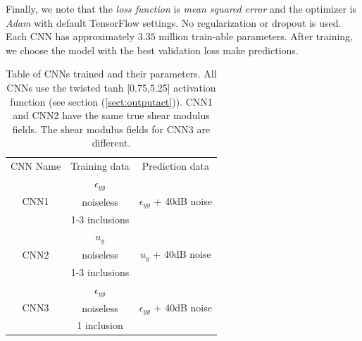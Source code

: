\documentclass[10pt]{article}
\begin{document}
Finally, we note that the \textit{loss function} is \textit{mean squared error} and the optimizer is \textit{Adam} \cite{misc:kingma2017adam} with default TensorFlow settings. No regularization or dropout is used.  Each CNN has approximately $3.35$ million train-able parameters. After training, we choose the model with the best validation loss make predictions.
%
\begin{center}
\begin{table}
  \centering
  \begin{tabular}{|c|c|c|}
    \hline
    \multirow{2}{*}{CNN Name} &  \multirow{2}{*}{Training data}           & \multirow{2}{*}{Prediction data}\\
                              &                                           &  \\
     \hline
     \multirow{3}{*}{CNN1}    &  $\epsilon_{yy}$                           &  \multirow{3}{*}{$\epsilon_{yy}$ + 40dB noise}\\
                              &  noiseless                                & \\
                              &  1-3 inclusions                           &\\
     \hline
     \multirow{3}{*}{CNN2}    &  $u_{y}$                                   & \multirow{3}{*}{$u_{y}$ + 40dB noise}\\
                              &  noiseless                                & \\
                              &  1-3 inclusions                           &\\  
     \hline
     \multirow{3}{*}{CNN3}    &  $\epsilon_{yy}$                           & \multirow{3}{*}{$\epsilon_{yy}$ + 40dB noise}\\
                              &  noiseless                                & \\
                              &  1 inclusion                              & \\

    \hline
  \end{tabular}
  \caption{\label{table:cnnparams} Table of CNNs trained and their parameters. All CNNs use the twisted tanh [0.75,5.25] activation function (see section (\ref{sect:outputact})). CNN1 and CNN2 have the same true shear modulus fields. The shear modulus fields for CNN3 are different.}
\end{table}
\end{center}
%
\end{document}
